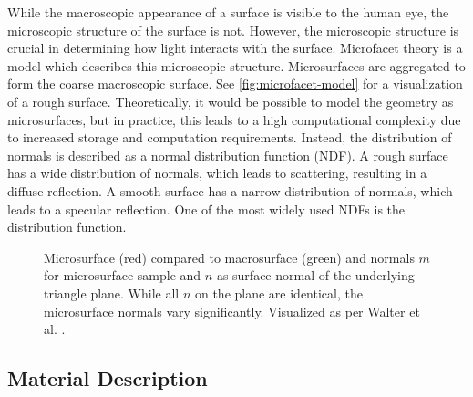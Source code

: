While the macroscopic appearance of a surface is visible to the human eye, the microscopic structure of the surface is not. However, the microscopic structure is crucial in determining how light interacts with the surface. Microfacet theory is a model which describes this microscopic structure. Microsurfaces are aggregated to form the coarse macroscopic surface. See \autoref{fig:microfacet-model} for a visualization of a rough surface. Theoretically, it would be possible to model the geometry as microsurfaces, but in practice, this leads to a high computational complexity due to increased storage and computation requirements. Instead, the distribution of normals is described as a normal distribution function (\gls{NDF}). A rough surface has a wide distribution of normals, which leads to scattering, resulting in a diffuse reflection. A smooth surface has a narrow distribution of normals, which leads to a specular reflection. One of the most widely used \glspl{NDF} is the  distribution function. \cite{Pharr_Physically_Based_Rendering_2023}

\begin{figure}[H]
  \centering
  \caption{Microsurface (red) compared to macrosurface (green) and normals $m$ for microsurface sample and $n$ as surface normal of the underlying triangle plane. While all $n$ on the plane are identical, the microsurface normals vary significantly. Visualized as per Walter et al. \cite{walter2007microfacet}.}
  \label{fig:microfacet-model}
\end{figure}

\subsection*{Material Description}

